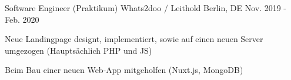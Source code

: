 
\begin{cventries}
  \cventry
    {Software Engineer (Praktikum)} %
    {Whats2doo / Leithold} %
    {Berlin, DE} %
    {Nov. 2019 - Feb. 2020} %
    {
      \begin{cvitems} %
        \item {Neue Landingpage designt, implementiert, sowie auf einen neuen Server umgezogen (Hauptsächlich PHP und JS)}
        \item {Beim Bau einer neuen Web-App mitgeholfen (Nuxt.js, MongoDB)}
      \end{cvitems}
    }

\end{cventries}
